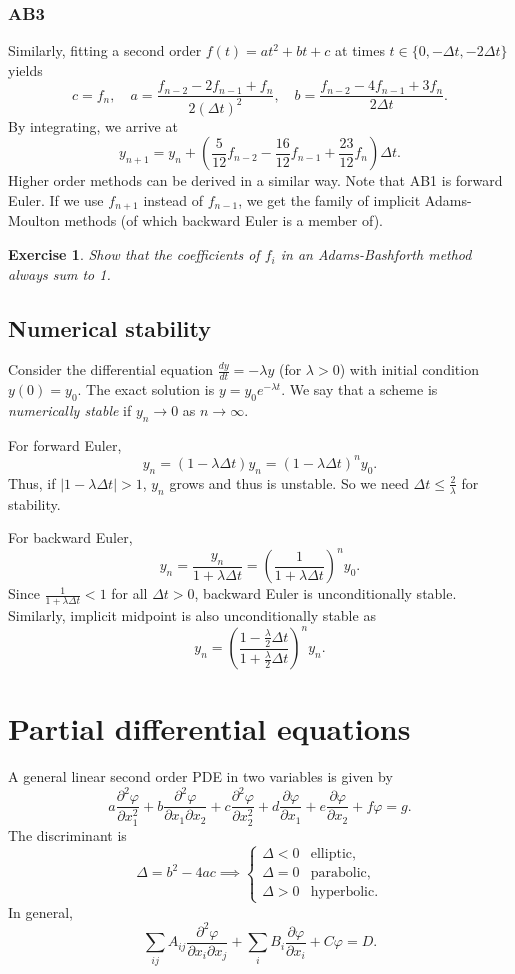\documentclass[11pt, a4paper]{article}
\renewcommand{\phi}{\varphi}
\theoremstyle{break}
\newtheorem{ex}[thm]{Exercise}
\newcommand*{\set}[1]{\{#1\}}%
\newcommand*{\Paren}[1]{\left(#1\right)}%
\newcommand{\dt}{\Delta t}
\newcommand{\der}[2]{\frac{\partial #1}{\partial #2}}
\newcommand{\pder}[3][2]{\frac{\partial^#1 #2}{\partial #3^#1}}
\newcommand{\dder}[2]{\frac{d #1}{d #2}}
\begin{document}
\subsubsection{AB3}
Similarly, fitting a second order $f(t)=at^2+bt+c$ at times $t\in\set{0,-\dt,-2\dt}$ yields \[c=f_n,\quad a=\frac{f_{n-2}-2f_{n-1}+f_n}{2(\dt)^2}, \quad b=\frac{f_{n-2}-4f_{n-1}+3f_n}{2\dt}.\] By integrating, we arrive at \[y_{n+1}=y_n+\Paren{\frac5{12}f_{n-2}-\frac{16}{12}f_{n-1}+\frac{23}{12}f_n}\dt.\]
Higher order methods can be derived in a similar way. Note that AB1 is forward Euler. If we use $f_{n+1}$ instead of $f_{n-1}$, we get the family of implicit Adams-Moulton methods (of which backward Euler is a member of).
\begin{ex}
	Show that the coefficients of $f_i$ in an Adams-Bashforth method always sum to 1.
\end{ex}

\subsection{Numerical stability}
Consider the differential equation $\dder yt=-\lambda y$ (for $\lambda>0$) with initial condition $y(0)=y_0$. The exact solution is $y=y_0e^{-\lambda t}$. We say that a scheme is \emph{numerically stable} if $y_n\to 0$ as $n\to \infty$.

For forward Euler, \[y_{n}=(1-\lambda \dt)y_n =(1-\lambda \dt)^ny_0.\] Thus, if $|1-\lambda \dt|>1$, $y_n$ grows and thus is unstable. So we need $\dt\leq\frac2\lambda$ for stability. 

For backward Euler, \[y_n=\frac{y_n}{1+\lambda \dt}=\Paren{\frac{1}{1+\lambda\dt}}^ny_0.\] Since $\frac{1}{1+\lambda\dt}<1$ for all $\dt>0$, backward Euler is unconditionally stable. Similarly, implicit midpoint is also unconditionally stable as \[y_n=\Paren{\frac{1-\frac\lambda2\dt}{1+\frac\lambda2\dt}}^ny_n.\]

\section{Partial differential equations}
	A general linear second order PDE in two variables is given by \[a\pder\phi{x_1}+b\frac{\partial^2\phi}{\partial x_1\partial x_2}+c\pder\phi{x_2}+d\der\phi{x_1}+e\der\phi{x_2}+f\phi = g.\]
The discriminant is \[\Delta = b^2-4ac \implies \begin{cases}
	\Delta<0 & \text{elliptic},\\ \Delta =0& \text{parabolic}, \\\Delta>0 &\text{hyperbolic}.
\end{cases}\]
In general, \[\sum_{ij}A_{ij}\frac{\partial^2\phi}{\partial x_i\partial x_j}+\sum_i B_i\der\phi{x_i}+C\phi = D.\]
\end{document}
